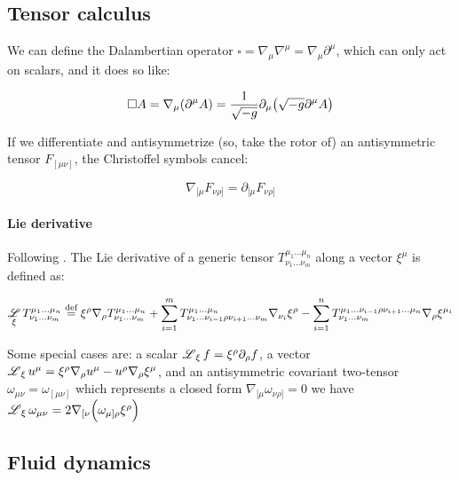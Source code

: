 \documentclass[main.tex]{subfiles}
\begin{document}
\subsection{Tensor calculus}

We can define the Dalambertian operator $\square = \nabla_\mu \nabla^\mu = \nabla_\mu \partial^\mu$, which can only act on scalars, and it does so like:

\begin{equation}
    \square A = \nabla_\mu (\partial^\mu A) =  \frac{1}{\sqrt{-g}}\partial_\mu \qty(\sqrt{-g}\partial^\mu A)
\end{equation}

If we differentiate and antisymmetrize (so, take the rotor of) an antisymmetric tensor $F_{[\mu \nu]}$, the Christoffel symbols cancel:

\begin{equation}
    \nabla_{[\mu} F_{\nu\rho]} = \partial_{[\mu} F_{\nu\rho]}
\end{equation}

\paragraph{Lie derivative}

Following \cite[section 6]{Taub:1978}. The Lie derivative of a generic tensor \(T^{\mu_1 \dots \mu_n} _{\nu_1 \dots \nu_m}\) along a vector \(\xi^\mu\) is defined as:

\begin{equation}
    \operatorname*{\mathscr L}_{\xi} T^{\mu_1 \dots \mu_n} _{\nu_1 \dots \nu_m} \stackrel{\text{def}}{=}
    \xi^\rho \nabla_\rho T^{\mu_1 \dots \mu_n} _{\nu_1 \dots \nu_m}
    + \sum_{i=1}^{m} T^{\mu_1 \dots \mu_n} _{\nu_1 \dots \nu_{i-1} \rho \nu_{i+1} \dots \nu_m} \nabla_{\nu_i} \xi^\rho
    - \sum_{i=1}^{n} T^{\mu_1 \dots \nu_{i-1} \rho \nu_{i+1} \dots \mu_n} _{\nu_1 \dots  \nu_m} \nabla_{\rho} \xi^{\mu_i}
\end{equation}

Some special cases are: a scalar \(\operatorname*{\mathscr L} _\xi f = \xi^\rho \partial_\rho f \), a vector \(\operatorname*{\mathscr L} _\xi u^\mu = \xi^\rho \nabla_\rho u^\mu -u^\rho \nabla_\rho \xi^\mu\), and  an antisymmetric covariant two-tensor \(\omega_{\mu\nu} = \omega_{[\mu \nu]}\) which represents a closed form \(\nabla_{[\mu} \omega_{\nu \rho]} = 0\) we have \(\operatorname*{\mathscr L} _\xi \omega_{\mu\nu} =2\nabla_{[\nu} \qty( \omega_{\mu] \rho} \xi^\rho )\)

\subsection{Fluid dynamics}
\end{document}
